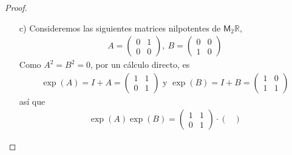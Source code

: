 \documentclass[11pt]{article}
\newcommand{\R}{\mathbb{R}}
\begin{document}
\begin{proof}
\begin{itemize}
\begin{align*}
e^tA := \sum_{k \geq 0}\frac{(tA)^k}{k!}.
\end{align*}
En efecto, notemos que esta serie es absolutamente covergente para todo $t \in \R$ ya que
\begin{align*}
\sum_{k \geq 0}\left\|\frac{(tA^k)}{k!}\right\| = \sum_{k \geq 0}\frac{t^k}{k!}\|A^k\| \leq \sum_{k \geq 0}\frac{t^k}{k!}\|A\|^k = \sum_{k \geq 0}\frac{(\|A\|t)^k}{k!} = e^{t\|A\|} < + \infty.
\end{align*}
Por lo tanto, podemos derivar t\'ermino a t\'ermino,
\begin{align*}
\frac{d}{dt}e^{tA} &= \sum_{k \geq 0}\frac{d}{dt}\frac{(tA)^k}{k!} = \sum_{k \geq 0}\frac{d}{dt}\frac{t^kA^k}{k!} = \sum_{k \geq 1}\frac{kt^{k-1}A^k}{k!}\\ 
&= A\sum_{k \geq 1}\frac{(tA)^{k-1}}{(k-1)!} = A\sum_{k \geq 0}\frac{(tA)^{k}}{k!} = Ae^{tA},
\end{align*}
y es claro adem\'as que $e^{0 \cdot A} = I + \sum_{k \geq 1}\frac{0^k}{k!} = I$. En conclusi\'on, identificando $T_I\mathsf{M}_n\R$ con $\mathsf{M}_n\R$ obtenemos $\exp(A) = e^A$ para toda $A \in \mathsf{M}_n\R$.
\item[c)] Consideremos las siguientes matrices nilpotentes de $\mathsf{M}_2\R$,
\begin{align*}
A = \begin{pmatrix}
0 & 1\\
0 & 0
\end{pmatrix}, \ B = \begin{pmatrix}
0 & 0\\
1 & 0
\end{pmatrix}
\end{align*}
Como $A^2 = B^2 = 0$, por un c\'alculo directo, es
\begin{align*}
\exp(A) = I + A = \begin{pmatrix}
1 & 1\\
0 & 1
\end{pmatrix} \text{ y } \exp(B) = I + B = \begin{pmatrix}
1 & 0\\
1 & 1
\end{pmatrix}
\end{align*}
as\'i que 
\begin{align*}
\exp(A)\exp(B) = \begin{pmatrix}
1 & 1\\
0 & 1
\end{pmatrix} \cdot \begin{pmatrix}

\end{pmatrix}
\end{align*}
\end{itemize}
\end{proof}
\end{document}
